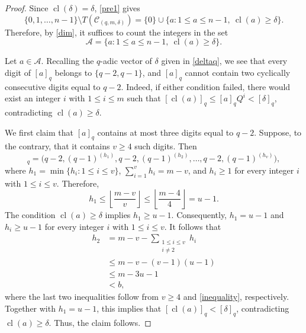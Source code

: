\documentclass[journal,onecolumn]{IEEEtran}
\newcommand{\cl}{\operatorname{cl}}
\begin{document}
\begin{proof} Since $\cl(\delta)=\delta$,
\eqref{pre1} gives 
\begin{equation}\label{sets}
\{0,1,\ldots,n-1\}\setminus T(\mathcal{C}_{(q,m,\delta)})
=
\{0\}\cup
\{a:1\leq a\leq n-1,\ \cl(a)\geq\delta\}.
\end{equation}
Therefore, by \eqref{dim}, it suffices to count the integers in the set
\begin{equation*}
\mathcal{A}
=
\{a:1\leq a\leq n-1,\ \cl(a)\geq\delta\}.
\end{equation*}

Let $a\in\mathcal{A}$. Recalling the $q$-adic vector of $\delta$ given in
\eqref{deltaq}, we see that every digit of $[a]_q$ belongs to
$\{q-2,q-1\}$, and $[a]_q$ cannot contain two cyclically consecutive
digits equal to $q-2$.  Indeed, if either condition failed, there would exist an
integer $i$ with $1\leq i\leq m$ such that
$[\cl(a)]_q\leq [a]_qQ^i<[\delta]_q$, contradicting $\cl(a)\geq \delta$.   

We first claim that $[a]_q$ contains at most three digits equal to $q-2$.
Suppose, to the contrary, that it contains $v\geq4$ such digits. Then
\begin{equation*}
[\cl(a)]_q
=
\bigl(
q-2,(q-1)^{(h_1)},q-2,(q-1)^{(h_2)},
\ldots,q-2,(q-1)^{(h_v)}
\bigr),
\end{equation*}
where $h_1=\min\{h_i:1\leq i\leq v\}$,
$\sum_{i=1}^{v}h_i=m-v$, and $h_i\geq1$ for every integer  $i$ with $1\leq i\leq v$. Therefore,
\begin{equation*}
h_1
\leq
\left\lfloor\frac{m-v}{v}\right\rfloor
\leq
\left\lfloor\frac{m-4}{4}\right\rfloor
=u-1.
\end{equation*}
The condition  $\cl(a)\geq\delta$ implies $h_1\geq u-1$. Consequently, 
$h_1=u-1$ and  $h_i\geq u-1$ for every integer $i$ with  $1\leq i\leq v$. 
It follows that
\begin{equation*}
\begin{aligned}
h_2
&=m-v-\sum_{\substack{1\leq i\leq v\\i\neq2}}h_i\\
&\leq m-v-(v-1)(u-1)\\
&\leq m-3u-1\\
&<b,
\end{aligned}
\end{equation*}
where the last two inequalities follow from $v\geq4$ and
\eqref{inequality}, respectively.  Together with $h_1=u-1$, this implies that  $[\cl(a)]_q<[\delta]_q$, contradicting
$\cl(a)\geq\delta$. Thus, the claim follows.


\end{proof}
\end{document}
